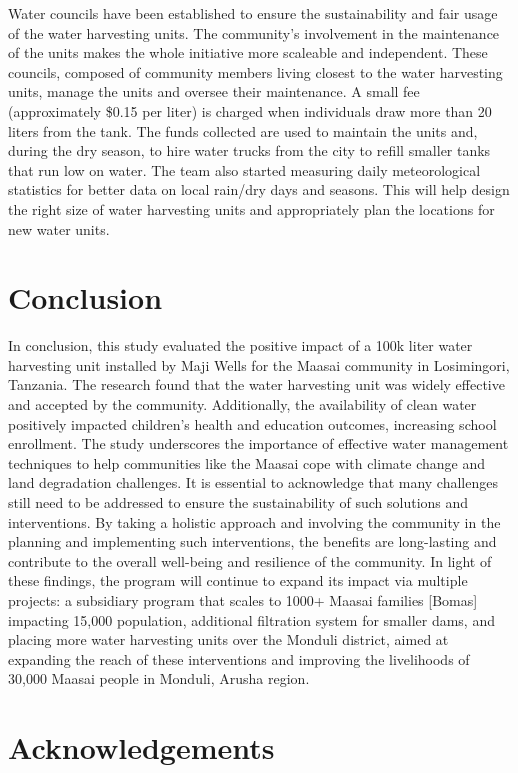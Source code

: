 \documentclass[10pt, twocolumn]{article}
\begin{document}
Water councils have been established to ensure the sustainability and fair usage of the water harvesting units. The community's involvement in the maintenance of the units makes the whole initiative more scaleable and independent. These councils, composed of community members living closest to the water harvesting units, manage the units and oversee their maintenance. A small fee (approximately \$0.15 per liter) is charged when individuals draw more than 20 liters from the tank. The funds collected are used to maintain the units and, during the dry season, to hire water trucks from the city to refill smaller tanks that run low on water. The team also started measuring daily meteorological statistics for better data on local rain/dry days and seasons. This will help design the right size of water harvesting units and appropriately plan the locations for new water units.

\section{Conclusion}

In conclusion, this study evaluated the positive impact of a 100k liter water harvesting unit installed by Maji Wells for the Maasai community in Losimingori, Tanzania. The research found that the water harvesting unit was widely effective and accepted by the community. Additionally, the availability of clean water positively impacted children's health and education outcomes, increasing school enrollment. The study underscores the importance of effective water management techniques to help communities like the Maasai cope with climate change and land degradation challenges. It is essential to acknowledge that many challenges still need to be addressed to ensure the sustainability of such solutions and interventions. By taking a holistic approach and involving the community in the planning and implementing such interventions, the benefits are long-lasting and contribute to the overall well-being and resilience of the community. In light of these findings, the program will continue to expand its impact via multiple projects: a subsidiary program that scales to 1000+ Maasai families [Bomas] impacting 15,000 population, additional filtration system for smaller dams, and placing more water harvesting units over the Monduli district, aimed at expanding the reach of these interventions and improving the livelihoods of 30,000 Maasai people in Monduli, Arusha region.

\section*{Acknowledgements}
\end{document}
